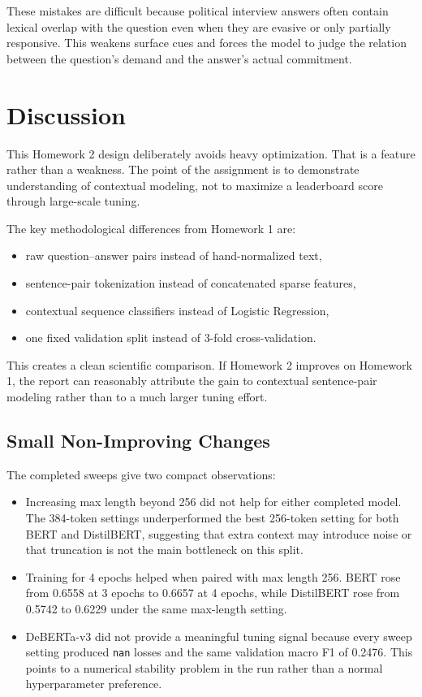 These mistakes are difficult because political interview answers often contain lexical overlap with the question even when they are evasive or only partially responsive. This weakens surface cues and forces the model to judge the relation between the question's demand and the answer's actual commitment.

\section{Discussion}

This Homework 2 design deliberately avoids heavy optimization. That is a feature rather than a weakness. The point of the assignment is to demonstrate understanding of contextual modeling, not to maximize a leaderboard score through large-scale tuning.

The key methodological differences from Homework 1 are:
\begin{itemize}
	\item raw question--answer pairs instead of hand-normalized text,
	\item sentence-pair tokenization instead of concatenated sparse features,
	\item contextual sequence classifiers instead of Logistic Regression,
	\item one fixed validation split instead of 3-fold cross-validation.
\end{itemize}

This creates a clean scientific comparison. If Homework 2 improves on Homework 1, the report can reasonably attribute the gain to contextual sentence-pair modeling rather than to a much larger tuning effort.

\subsection{Small Non-Improving Changes}

The completed sweeps give two compact observations:
\begin{itemize}
	\item Increasing max length beyond 256 did not help for either completed model. The 384-token settings underperformed the best 256-token setting for both BERT and DistilBERT, suggesting that extra context may introduce noise or that truncation is not the main bottleneck on this split.
	\item Training for 4 epochs helped when paired with max length 256. BERT rose from 0.6558 at 3 epochs to 0.6657 at 4 epochs, while DistilBERT rose from 0.5742 to 0.6229 under the same max-length setting.
	\item DeBERTa-v3 did not provide a meaningful tuning signal because every sweep setting produced \texttt{nan} losses and the same validation macro F1 of 0.2476. This points to a numerical stability problem in the run rather than a normal hyperparameter preference.
\end{itemize}


